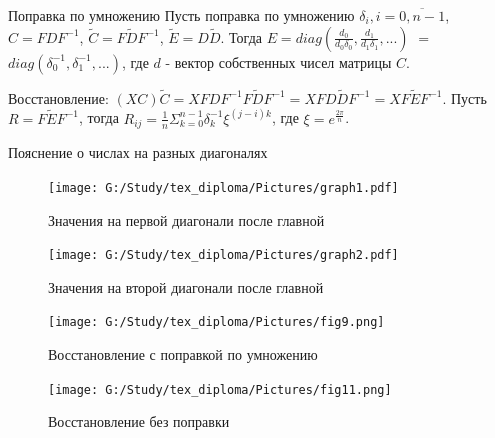 \documentclass[10pt]{beamer}
\begin{document}
\begin{frame}

\begin{block}{Поправка по умножению}
Пусть поправка по умножению $\delta_i, i = \overline{0, n-1}$, $C = FDF^{-1}$, $\tilde{C} = F\tilde{D}F^{-1}$, $\tilde{E} = D\tilde{D}$. Тогда $E = diag(\frac{d_0}{d_0\delta_0}, \frac{d_1}{d_1\delta_1}, ...)$ $=$ $diag(\delta_0^{-1}, \delta_1^{-1}, ...)$, где $d$ - вектор собственных чисел матрицы $C$.


Восстановление: $(XC)\tilde{C} = XFDF^{-1}F\tilde{D}F^{-1} = XFD\tilde{D}F^{-1} = XF\tilde{E}F^{-1}$. Пусть $R = F\tilde{E}F^{-1}$, тогда $R_{ij} = \frac{1}{n}\Sigma_{k=0}^{n-1} \delta_k^{-1} \xi^{(j-i)k}$, где $\xi = e^{\frac{2\pi}{n}}$.
\end{block}

\begin{block}{Пояснение о числах на разных диагоналях}
\begin{minipage}{50mm}
    \begin{figure}[H]
            \texttt{[image: G:/Study/tex\_diploma/Pictures/graph1.pdf]}
            \label{Graph1}
            \caption[Значения на первой диагонали после главной]{Значения на первой диагонали после главной}
        \end{figure}
\end{minipage}
\hfill
\begin{minipage}{50mm}
  \begin{figure}[H]
            \texttt{[image: G:/Study/tex\_diploma/Pictures/graph2.pdf]}
            \label{Graph2}
            \caption[Значения на второй диагонали после главной]{Значения на второй диагонали после главной}
        \end{figure}
\end{minipage}
\hfill
\end{block}

\end{frame}



\begin{frame}

\begin{minipage}{50mm}
    \begin{figure}[H]
            \texttt{[image: G:/Study/tex\_diploma/Pictures/fig9.png]}
            \label{Pic9}
            \caption[Восстановление с поправкой по умножению]{Восстановление с поправкой по умножению}
        \end{figure}
\end{minipage}
\hfill
\begin{minipage}{50mm}
    \begin{figure}[H]
            \texttt{[image: G:/Study/tex\_diploma/Pictures/fig11.png]}
            \label{Pic9}
            \caption[Восстановление без поправки]{Восстановление без поправки}
        \end{figure}
\end{minipage}
\vspace*{2mm}

\end{frame}
\end{document}
